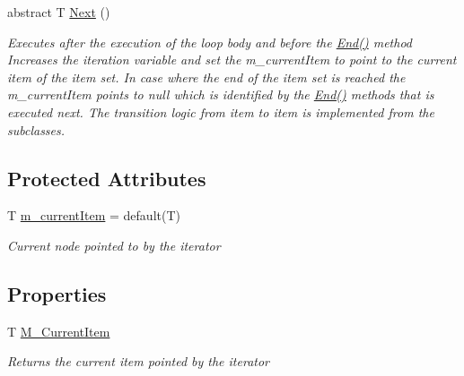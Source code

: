 \begin{DoxyCompactItemize}
abstract T \hyperlink{class_graph_library_1_1_generics_1_1_abstract_graph_iterator_aac8cffd0d579708a94ba056e4f4a00b2}{Next} ()
\begin{DoxyCompactList}\small\item\em Executes after the execution of the loop body and before the \hyperlink{class_graph_library_1_1_generics_1_1_abstract_graph_iterator_aa8cd9f596ec0b6c4c1e9c244ba75df04}{End()} method Increases the iteration variable and set the m\+\_\+current\+Item to point to the current item of the item set. In case where the end of the item set is reached the m\+\_\+current\+Item points to null which is identified by the \hyperlink{class_graph_library_1_1_generics_1_1_abstract_graph_iterator_aa8cd9f596ec0b6c4c1e9c244ba75df04}{End()} methods that is executed next. The transition logic from item to item is implemented from the subclasses. \end{DoxyCompactList}\end{DoxyCompactItemize}
\subsection*{Protected Attributes}
\begin{DoxyCompactItemize}
\item 
T \hyperlink{class_graph_library_1_1_generics_1_1_abstract_graph_iterator_a19c7904539e8519162a4c42739d37757}{m\+\_\+current\+Item} = default(T)
\begin{DoxyCompactList}\small\item\em Current node pointed to by the iterator \end{DoxyCompactList}\end{DoxyCompactItemize}
\subsection*{Properties}
\begin{DoxyCompactItemize}
\item 
T \hyperlink{class_graph_library_1_1_generics_1_1_abstract_graph_iterator_a6621ff4270d662b95a80c7cbcc75b68c}{M\+\_\+\+Current\+Item}
\begin{DoxyCompactList}\small\item\em Returns the current item pointed by the iterator \end{DoxyCompactList}\end{DoxyCompactItemize}


